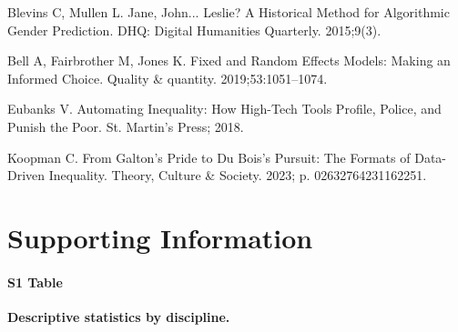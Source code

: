 \documentclass[
  10pt,
  letterpaper,
]{article}
\begin{document}
\begin{thebibliography}{10}
Blevins C, Mullen L.
\newblock Jane, {{John}}... {{Leslie}}? {{A Historical Method}} for {{Algorithmic Gender Prediction}}.
\newblock DHQ: Digital Humanities Quarterly. 2015;9(3).

Bell A, Fairbrother M, Jones K.
\newblock Fixed and Random Effects Models: Making an Informed Choice.
\newblock Quality \& quantity. 2019;53:1051--1074.

Eubanks V.
\newblock Automating Inequality: {{How}} High-Tech Tools Profile, Police, and Punish the Poor.
\newblock St. Martin's Press; 2018.

Koopman C.
\newblock From {{Galton}}'s {{Pride}} to {{Du Bois}}'s {{Pursuit}}: {{The Formats}} of {{Data-Driven Inequality}}.
\newblock Theory, Culture \& Society. 2023; p. 02632764231162251.

\end{thebibliography}

\section{Supporting Information}\label{supporting-information}

\paragraph*{S1 Table}
\label{id}
{\textbf{Descriptive statistics by discipline.}}


\nolinenumbers
\end{document}
